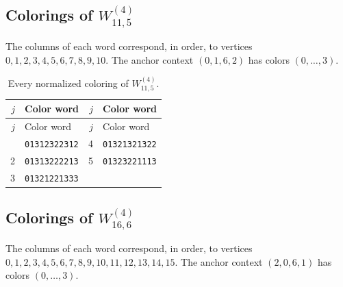 \documentclass[aps,pra,reprint,superscriptaddress,longbibliography,nofootinbib,floatfix,10pt]{revtex4-2}
\theoremstyle{definition}
\begin{document}
\subsection{Colorings of \texorpdfstring{$W_{11,5}^{(4)}$}{gadget 4a}}
The columns of each word correspond, in order, to vertices $0,\allowbreak 1,\allowbreak 2,\allowbreak 3,\allowbreak 4,\allowbreak 5,\allowbreak 6,\allowbreak 7,\allowbreak 8,\allowbreak 9,\allowbreak 10$. The anchor context $(0,1,6,2)$ has colors $(0,\ldots,3)$.
\begingroup\footnotesize\setlength{\tabcolsep}{3pt}\setlength{\LTpre}{5pt}\setlength{\LTpost}{8pt}
\begin{longtable}{rl@{\qquad}rl}
\caption{Every normalized coloring of $W_{11,5}^{(4)}$.}\label{tab:colors-4a}\\\toprule $j$ & Color word & $j$ & Color word\\\midrule\endfirsthead
\toprule $j$ & Color word & $j$ & Color word\\\midrule\endhead\bottomrule\endfoot
1 & \texttt{01312322312} & 4 & \texttt{01321321322}\\
2 & \texttt{01313222213} & 5 & \texttt{01323221113}\\
3 & \texttt{01321221333} &  & \\
\end{longtable}\endgroup
{}\subsection{Colorings of \texorpdfstring{$W_{16,6}^{(4)}$}{gadget 4b}}
The columns of each word correspond, in order, to vertices $0,\allowbreak 1,\allowbreak 2,\allowbreak 3,\allowbreak 4,\allowbreak 5,\allowbreak 6,\allowbreak 7,\allowbreak 8,\allowbreak 9,\allowbreak 10,\allowbreak 11,\allowbreak 12,\allowbreak 13,\allowbreak 14,\allowbreak 15$. The anchor context $(2,0,6,1)$ has colors $(0,\ldots,3)$.
\begingroup\footnotesize\setlength{\tabcolsep}{3pt}\setlength{\LTpre}{5pt}\setlength{\LTpost}{8pt}
\end{document}
